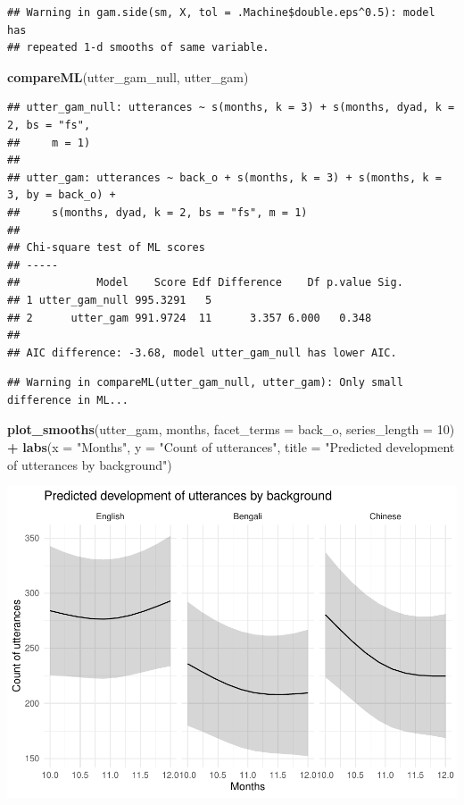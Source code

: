 \documentclass[]{article}
\newenvironment{Shaded}{\begin{snugshade}}{\end{snugshade}}
\newcommand{\DataTypeTok}[1]{\textcolor[rgb]{0.13,0.29,0.53}{#1}}
\newcommand{\DecValTok}[1]{\textcolor[rgb]{0.00,0.00,0.81}{#1}}
\newcommand{\KeywordTok}[1]{\textcolor[rgb]{0.13,0.29,0.53}{\textbf{#1}}}
\newcommand{\NormalTok}[1]{#1}
\newcommand{\OperatorTok}[1]{\textcolor[rgb]{0.81,0.36,0.00}{\textbf{#1}}}
\newcommand{\StringTok}[1]{\textcolor[rgb]{0.31,0.60,0.02}{#1}}
\begin{document}
\begin{verbatim}
## Warning in gam.side(sm, X, tol = .Machine$double.eps^0.5): model has
## repeated 1-d smooths of same variable.
\end{verbatim}

\begin{Shaded}
\begin{Highlighting}[]
\KeywordTok{compareML}\NormalTok{(utter_gam_null, utter_gam)}
\end{Highlighting}
\end{Shaded}

\begin{verbatim}
## utter_gam_null: utterances ~ s(months, k = 3) + s(months, dyad, k = 2, bs = "fs", 
##     m = 1)
## 
## utter_gam: utterances ~ back_o + s(months, k = 3) + s(months, k = 3, by = back_o) + 
##     s(months, dyad, k = 2, bs = "fs", m = 1)
## 
## Chi-square test of ML scores
## -----
##            Model    Score Edf Difference    Df p.value Sig.
## 1 utter_gam_null 995.3291   5                              
## 2      utter_gam 991.9724  11      3.357 6.000   0.348     
## 
## AIC difference: -3.68, model utter_gam_null has lower AIC.
\end{verbatim}

\begin{verbatim}
## Warning in compareML(utter_gam_null, utter_gam): Only small difference in ML...
\end{verbatim}

\begin{Shaded}
\begin{Highlighting}[]
\KeywordTok{plot_smooths}\NormalTok{(utter_gam, months, }\DataTypeTok{facet_terms =}\NormalTok{ back_o, }\DataTypeTok{series_length =} \DecValTok{10}\NormalTok{) }\OperatorTok{+}
\StringTok{  }\KeywordTok{labs}\NormalTok{(}\DataTypeTok{x =} \StringTok{"Months"}\NormalTok{, }\DataTypeTok{y =} \StringTok{"Count of utterances"}\NormalTok{, }\DataTypeTok{title =} \StringTok{"Predicted development of utterances by background"}\NormalTok{)}
\end{Highlighting}
\end{Shaded}

\includegraphics{supplement_files/figure-latex/utter-gam-plot-1.pdf}
\end{document}
